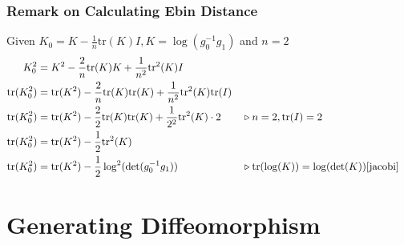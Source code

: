 \documentclass{article}
\theoremstyle{definition}
\theoremstyle{plain}
\begin{document}
\subsubsection{Remark on Calculating Ebin Distance}
Given $K_0=K-\frac{1}{n}\mathrm{tr}(K)I, K=\log(g_0^{-1}g_1)$ and $n=2$
\begin{align*}
    K_0^2&=K^2-\frac{2}{n}\mathrm{tr}(K)K+\frac{1}{n^2}\mathrm{tr}^2(K)I\\
    \mathrm{tr}(K^2_0)&=\mathrm{tr}(K^2)-\frac{2}{n}\mathrm{tr}(K)\mathrm{tr}(K)+\frac{1}{n^2}\mathrm{tr}^2(K)\mathrm{tr}(I)\\
    \mathrm{tr}(K^2_0)&=\mathrm{tr}(K^2)-\frac{2}{2}\mathrm{tr}(K)\mathrm{tr}(K)+\frac{1}{2^2}\mathrm{tr}^2(K)\cdot2&&\triangleright n=2,\mathrm{tr}(I)=2\\
    \mathrm{tr}(K^2_0)&=\mathrm{tr}(K^2)-\frac{1}{2}\mathrm{tr}^2(K)\\
    \mathrm{tr}(K^2_0)&=\mathrm{tr}(K^2)-\frac{1}{2}\log^2(\det(g_0^{-1}g_1))&&\triangleright \mathrm{tr}(\log(K))=\log(\det(K))\cite{jacobi}
\end{align*}

\section{Generating Diffeomorphism}
\end{document}
